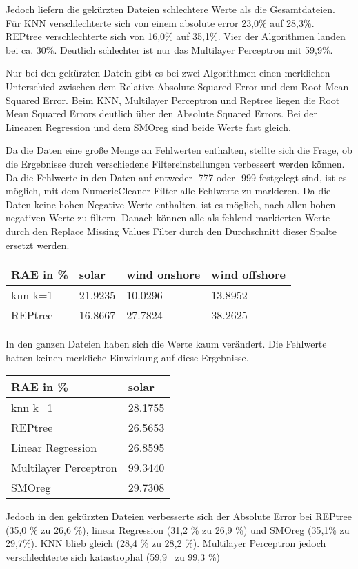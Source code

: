\documentclass[letterpaper]{article} %
\begin{document}
    Jedoch liefern die gekürzten Dateien schlechtere Werte als die Gesamtdateien. Für KNN verschlechterte sich von einem absolute error 23,0\% auf 28,3\%. REPtree verschlechterte sich von 16,0\% auf 35,1\%. Vier der Algorithmen landen bei ca. 30\%. Deutlich schlechter ist nur das Multilayer Perceptron mit 59,9\%.

    Nur bei den gekürzten Datein gibt es bei zwei Algorithmen einen merklichen Unterschied zwischen dem Relative Absolute Squared Error und dem Root Mean Squared Error. Beim KNN, Multilayer Perceptron und Reptree liegen die Root Mean Squared Errors deutlich über den Absolute Squared Errors. Bei der Linearen Regression und dem SMOreg sind beide Werte fast gleich.

    Da die Daten eine große Menge an Fehlwerten enthalten, stellte sich die Frage, ob die Ergebnisse durch verschiedene Filtereinstellungen verbessert werden können. Da die Fehlwerte in den Daten auf entweder -777 oder -999 festgelegt sind, ist es möglich, mit dem NumericCleaner Filter alle Fehlwerte zu markieren. Da die Daten keine hohen Negative Werte enthalten, ist es möglich, nach allen hohen negativen Werte zu filtern. Danach können alle als fehlend markierten Werte durch den Replace Missing Values Filter durch den Durchschnitt dieser Spalte ersetzt werden.
    \hfill\break
    \begin{center}
        \begin{tabular}{|l||l|l|l|}
            \hline
            RAE in \%&solar&wind onshore&wind offshore\\
            \hline
            \hline
            knn k=1&21.9235&10.0296&13.8952\\
            \hline
            REPtree&16.8667&27.7824&38.2625\\
            \hline
        \end{tabular}
    \end{center}
    \hfill\break
    In den ganzen Dateien haben sich die Werte kaum verändert. Die Fehlwerte hatten keinen merkliche Einwirkung auf diese Ergebnisse.
    \hfill\break
    \begin{center}
        \begin{tabular}{|l||l|}
            \hline
            RAE in \%&solar\\
            \hline
            \hline
            knn k=1&28.1755\\
            \hline
            REPtree&26.5653\\
            \hline
            Linear Regression&26.8595\\
            \hline
            Multilayer Perceptron&99.3440\\
            \hline
            SMOreg&29.7308\\
            \hline
        \end{tabular}
    \end{center}
    \hfill\break
    Jedoch in den gekürzten Dateien verbesserte sich der Absolute Error bei REPtree (35,0 \% zu 26,6 \%), linear Regression (31,2 \% zu 26,9 \%) und SMOreg (35,1\% zu 29,7\%). KNN blieb gleich (28,4 \% zu 28,2 \%). Multilayer Perceptron jedoch verschlechterte sich katastrophal (59,9 \ zu 99,3 \%)
\end{document}

